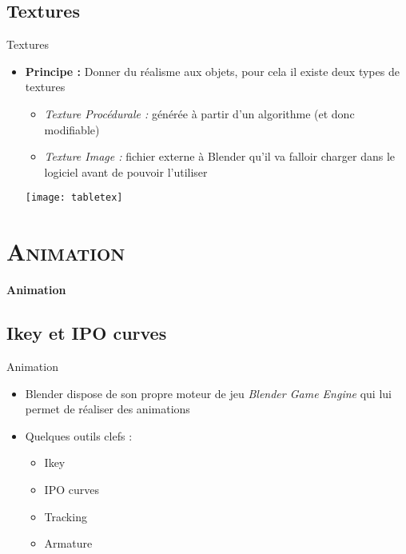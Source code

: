 \documentclass[xcolor=x11names,compress]{beamer}
\renewcommand{\(}{\begin{columns}}
\renewcommand{\)}{\end{columns}}
\newcommand{\<}[1]{\begin{column}{#1}}
\renewcommand{\>}{\end{column}}
\begin{document}
\subsection{Textures}
\begin{frame}{Textures}
\begin{itemize}
    \item \textbf{Principe :} Donner du réalisme aux objets, pour cela il existe deux types de textures
    \begin{itemize}
        \item \textit{Texture Procédurale :} générée à partir d'un algorithme (et donc modifiable)
        \item \textit{Texture Image :} fichier externe à Blender qu'il va falloir charger dans le logiciel avant de pouvoir l'utiliser
    \end{itemize}
\texttt{[image: tabletex]}
\end{itemize}
\end{frame}
\section{\scshape Animation}
\begin{frame}[c]{}
    \centering
    \huge
    \textbf{Animation}
\end{frame}

\subsection{Ikey et IPO curves}
\begin{frame}{Animation}
    \begin{itemize}
        \item Blender dispose de son propre moteur de jeu \textit{Blender Game Engine} qui lui permet de réaliser des animations
        \item Quelques outils clefs :
        \begin{itemize}
            \item Ikey
            \item IPO curves
            \item Tracking
            \item Armature
        \end{itemize}
    \end{itemize}
\end{frame}
\end{document}
